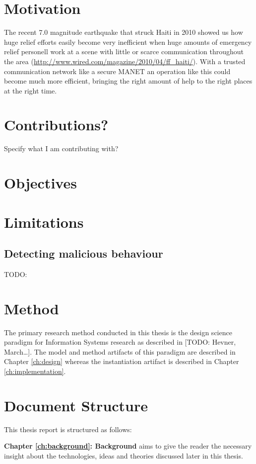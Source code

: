 \section{Motivation}
The recent 7.0 magnitude earthquake that struck Haiti in 2010 showed us how huge
relief efforts easily become very inefficient when huge amounts of emergency
relief personell work at a scene with little or scarce communication throughout
the area (\url{http://www.wired.com/magazine/2010/04/ff_haiti/}). With a trusted
communication network like a secure \ac{MANET} an operation like this could
become much more efficient, bringing the right amount of help to the right
places at the right time.

\section{Contributions?}
Specify what I am contributing with?

\section{Objectives}

\section{Limitations}

\subsection{Detecting malicious behaviour}
\label{limit:malicious_behaviour}
TODO:

\section{Method}
The primary research method conducted in this thesis is the design science
paradigm for Information Systems research as described in [TODO: Hevner,
March\ldots]. The model and method artifacts of this paradigm are described in
Chapter \ref{ch:design} whereas the instantiation artifact is described in
Chapter \ref{ch:implementation}.

\section{Document Structure}
This thesis report is structured as follows:

\textbf{Chapter \ref{ch:background}: Background} aims to give the reader the
necessary insight about the technologies, ideas and theories discussed later in
this thesis.

